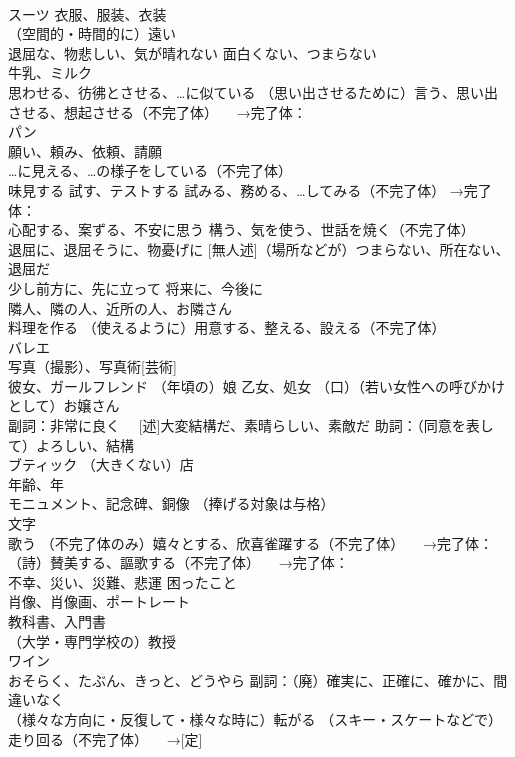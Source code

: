 \documentclass[8pt]{extreport}
\begin{document}
\begin{CJK}{UTF8}{min}
\\	スーツ 衣服、服装、衣装
\\	（空間的・時間的に）遠い
\\	退屈な、物悲しい、気が晴れない 面白くない、つまらない
\\	牛乳、ミルク
\\	思わせる、彷彿とさせる、…に似ている （思い出させるために）言う、思い出させる、想起させる（不完了体） 　→完了体：
\\	パン
\\	願い、頼み、依頼、請願
\\	…に見える、…の様子をしている（不完了体） 
\\	味見する 試す、テストする 試みる、務める、…してみる（不完了体） →完了体：
\\	心配する、案ずる、不安に思う 構う、気を使う、世話を焼く（不完了体）
\\	退屈に、退屈そうに、物憂げに [無人述]（場所などが）つまらない、所在ない、退屈だ
\\	少し前方に、先に立って 将来に、今後に
\\	隣人、隣の人、近所の人、お隣さん
\\	料理を作る （使えるように）用意する、整える、設える（不完了体）
\\	バレエ
\\	写真（撮影）、写真術[芸術]
\\	彼女、ガールフレンド （年頃の）娘 乙女、処女 （口）（若い女性への呼びかけとして）お嬢さん
\\	副詞：非常に良く 　[述]大変結構だ、素晴らしい、素敵だ 助詞：（同意を表して）よろしい、結構
\\	ブティック （大きくない）店
\\	年齢、年
\\	モニュメント、記念碑、銅像 （捧げる対象は与格）
\\	文字
\\	歌う （不完了体のみ）嬉々とする、欣喜雀躍する（不完了体） 　→完了体：
\\	（詩）賛美する、謳歌する（不完了体） 　→完了体：
\\	不幸、災い、災難、悲運 困ったこと
\\	肖像、肖像画、ポートレート
\\	教科書、入門書
\\	（大学・専門学校の）教授
\\	ワイン
\\	[挿入語]おそらく、たぶん、きっと、どうやら 副詞：（廃）確実に、正確に、確かに、間違いなく
\\	[不定]（様々な方向に・反復して・様々な時に）転がる （スキー・スケートなどで）走り回る（不完了体） 　→[定]

\end{CJK}
\end{document}
